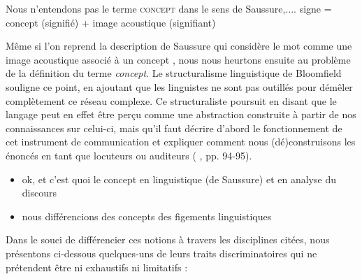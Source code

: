Nous n'entendons pas le terme \textsc{concept} dans le sens de Saussure,.... signe = concept (signifié) + image acoustique (signifiant)

Même si l'on reprend la description de Saussure qui considère le mot comme \og une image acoustique associé à un concept \fg{}, nous nous heurtons ensuite au problème de la définition du terme \textit{concept}. Le structuralisme linguistique de Bloomfield souligne ce point, en ajoutant que les linguistes ne sont pas outillés pour démêler complètement ce réseau complexe. Ce structuraliste poursuit en disant que le langage peut en effet être perçu comme une abstraction construite à partir de nos connaissances sur celui-ci, mais qu'il faut \og décrire d'abord le fonctionnement de cet instrument de communication \fg{} et expliquer comment nous (dé)construisons les énoncés en tant que locuteurs ou auditeurs (\citeauthor{mounin1968clefs} \citeyear{mounin1968clefs}, pp. 94-95).

\begin{itemize}
	\item ok, et c'est quoi le concept en linguistique (de Saussure) et en analyse du discours
	\item nous différencions des concepts des \og{}figements linguistiques\fg{} \citep{bezancon2023}
\end{itemize}



Dans le souci de différencier ces notions à travers les disciplines citées, nous présentons ci-dessous quelques-uns de leurs traits discriminatoires qui ne prétendent être ni exhaustifs ni limitatifs :

